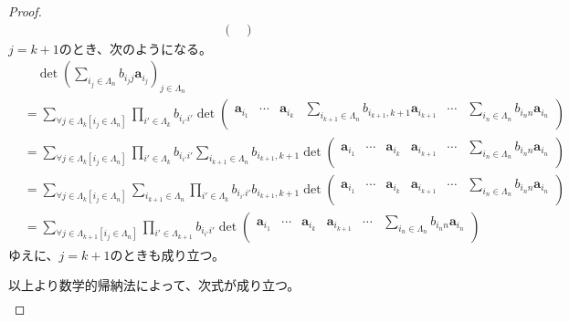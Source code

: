 \documentclass[dvipdfmx]{jsarticle}
\begin{document}
\begin{proof}
\begin{align*}
{\begin{pmatrix}
\end{pmatrix}}
\end{align*}
$j = k + 1$のとき、次のようになる。
\begin{align*}
&\quad \det\left( \sum_{i_{j} \in \varLambda_{n}} {b_{i_{j}j}\mathbf{a}_{i_{j}}} \right)_{j \in \varLambda_{n}}\\
&= \sum_{\forall j \in \varLambda_{k}\left[ i_{j} \in \varLambda_{n} \right]} {\prod_{i' \in \varLambda_{k}} b_{i_{i'}i'}\det\begin{pmatrix}
\mathbf{a}_{i_{1}} & \cdots & \mathbf{a}_{i_{k}} & \sum_{i_{k + 1} \in \varLambda_{n}} {b_{i_{k + 1},k + 1}\mathbf{a}_{i_{k + 1}}} & \cdots & \sum_{i_{n} \in \varLambda_{n}} {b_{i_{n}n}\mathbf{a}_{i_{n}}} \\
\end{pmatrix}}\\
&= \sum_{\forall j \in \varLambda_{k}\left[ i_{j} \in \varLambda_{n} \right]} {\prod_{i' \in \varLambda_{k}} b_{i_{i'}i'}\sum_{i_{k + 1} \in \varLambda_{n}} {b_{i_{k + 1},k + 1}\det\begin{pmatrix}
\mathbf{a}_{i_{1}} & \cdots & \mathbf{a}_{i_{k}} & \mathbf{a}_{i_{k + 1}} & \cdots & \sum_{i_{n} \in \varLambda_{n}} {b_{i_{n}n}\mathbf{a}_{i_{n}}} \\
\end{pmatrix}}}\\
&= \sum_{\forall j \in \varLambda_{k}\left[ i_{j} \in \varLambda_{n} \right]} {\sum_{i_{k + 1} \in \varLambda_{n}} {\prod_{i' \in \varLambda_{k}} b_{i_{i'}i'}b_{i_{k + 1},k + 1}\det\begin{pmatrix}
\mathbf{a}_{i_{1}} & \cdots & \mathbf{a}_{i_{k}} & \mathbf{a}_{i_{k + 1}} & \cdots & \sum_{i_{n} \in \varLambda_{n}} {b_{i_{n}n}\mathbf{a}_{i_{n}}} \\
\end{pmatrix}}}\\
&= \sum_{\forall j \in \varLambda_{k + 1}\left[ i_{j} \in \varLambda_{n} \right]} {\prod_{i' \in \varLambda_{k + 1}} b_{i_{i'}i'}\det\begin{pmatrix}
\mathbf{a}_{i_{1}} & \cdots & \mathbf{a}_{i_{k}} & \mathbf{a}_{i_{k + 1}} & \cdots & \sum_{i_{n} \in \varLambda_{n}} {b_{i_{n}n}\mathbf{a}_{i_{n}}} \\
\end{pmatrix}}
\end{align*}
ゆえに、$j = k + 1$のときも成り立つ。\par
以上より数学的帰納法によって、次式が成り立つ。
\begin{align*}

\end{align*}
\end{proof}
\end{document}
